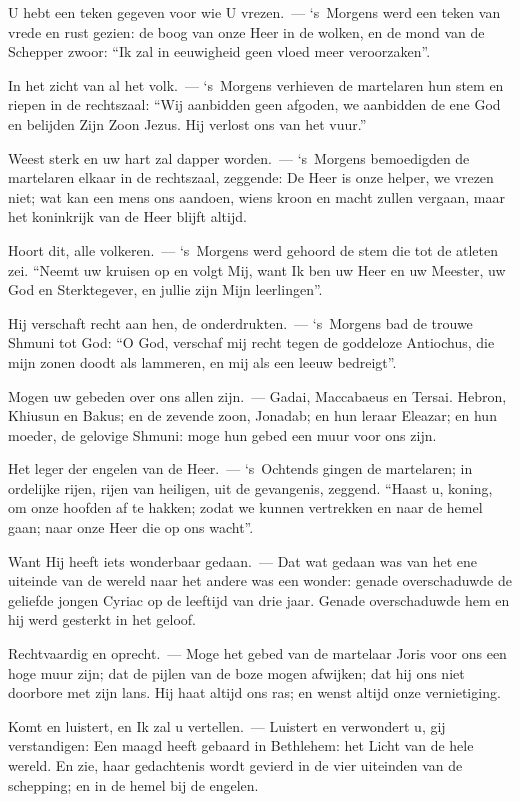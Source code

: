 \documentclass[12pt,twoside,a5paper]{article}
\begin{document}
\begin{halfparskip}
  U hebt een teken gegeven voor wie U vrezen.~--- `s~Morgens werd een teken van vrede en rust gezien: de boog van onze Heer in de wolken, en de mond van de Schepper zwoor: ``Ik zal in eeuwigheid geen vloed meer veroorzaken''.

  In het zicht van al het volk.~--- `s~Morgens verhieven de martelaren hun stem en riepen in de rechtszaal: ``Wij aanbidden geen afgoden, we aanbidden de ene God en belijden Zijn Zoon Jezus. Hij verlost ons van het vuur.''

  Weest sterk en uw hart zal dapper worden.~--- `s~Morgens bemoedigden de martelaren elkaar in de rechtszaal, zeggende: De Heer is onze helper, we vrezen niet; wat kan een mens ons aandoen, wiens kroon en macht zullen vergaan, maar het koninkrijk van de Heer blijft altijd.

  Hoort dit, alle volkeren.~--- `s~Morgens werd gehoord de stem die tot de atleten zei. ``Neemt uw kruisen op en volgt Mij, want Ik ben uw Heer en uw Meester, uw God en Sterktegever, en jullie zijn Mijn leerlingen''.

  Hij verschaft recht aan hen, de onderdrukten.~--- `s~Morgens bad de trouwe Shmuni tot God: ``O God, verschaf mij recht tegen de goddeloze Antiochus, die mijn zonen doodt als lammeren, en mij als een leeuw bedreigt''.

  Mogen uw gebeden over ons allen zijn.~--- Gadai, Maccabaeus en Tersai. Hebron, Khiusun en Bakus; en de zevende zoon, Jonadab; en hun leraar Eleazar; en hun moeder, de gelovige Shmuni: moge hun gebed een muur voor ons zijn.

  Het leger der engelen van de Heer.~--- `s~Ochtends gingen de martelaren; in ordelijke rijen, rijen van heiligen, uit de gevangenis, zeggend. ``Haast u, koning, om onze hoofden af te hakken; zodat we kunnen vertrekken en naar de hemel gaan; naar onze Heer die op ons wacht''.

  Want Hij heeft iets wonderbaar gedaan.~--- Dat wat gedaan was van het ene uiteinde van de wereld naar het andere was een wonder: genade overschaduwde de geliefde jongen Cyriac op de leeftijd van drie jaar. Genade overschaduwde hem en hij werd gesterkt in het geloof.

  Rechtvaardig en oprecht.~--- Moge het gebed van de martelaar Joris voor ons een hoge muur zijn; dat de pijlen van de boze mogen afwijken; dat hij ons niet doorbore met zijn lans. Hij haat altijd ons ras; en wenst altijd onze vernietiging.

  Komt en luistert, en Ik zal u vertellen.~--- Luistert en verwondert u, gij verstandigen: Een maagd heeft gebaard in Bethlehem: het Licht van de hele wereld. En zie, haar gedachtenis wordt gevierd in de vier uiteinden van de schepping; en in de hemel bij de engelen.


\end{halfparskip}
\end{document}
